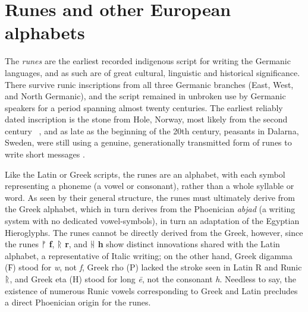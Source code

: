 
\section{Runes and other European alphabets}

The \emph{runes} are the earliest recorded indigenous script for writing the Germanic languages, and as such are of great cultural, linguistic and historical significance.  There survive runic inscriptions from all three Germanic branches (East, West, and North Germanic), and the script remained in unbroken use by Germanic speakers for a period spanning almost twenty centuries.  The earliest reliably dated inscription is the stone from Hole, Norway, most likely from the second century \ce\ \parencites{ZilmerVasshus2023}{SolheimEtAl2025}, and as late as the beginning of the 20th century, peasants in Dalarna, Sweden, were still using a genuine, generationally transmitted form of runes to write short messages \parencites{Jans2015}{Fridell2025}.

Like the Latin or Greek scripts, the runes are an alphabet, with each symbol representing a phoneme (a vowel or consonant), rather than a whole syllable or word.  As seen by their general structure, the runes must ultimately derive from the Greek alphabet, which in turn derives from the Phoenician \emph{abjad} (a writing system with no dedicated vowel-symbols), in turn an adaptation of the Egyptian Hieroglyphs.  The runes cannot be directly derived from the Greek, however, since the runes ᚠ \textbf{f}, ᚱ \textbf{r}, and ᚺ \textbf{h} show distinct innovations shared with the Latin alphabet, a representative of Italic writing; on the other hand, Greek digamma (\textgreek{Ϝ}) stood for \emph{w}, not \emph{f}, Greek rho (\textgreek{Ρ}) lacked the stroke seen in Latin R and Runic ᚱ, and Greek eta (\textgreek{Η}) stood for long \emph{ē}, not the consonant \emph{h}.  Needless to say, the existence of numerous Runic vowels corresponding to Greek and Latin precludes a direct Phoenician origin for the runes.%

